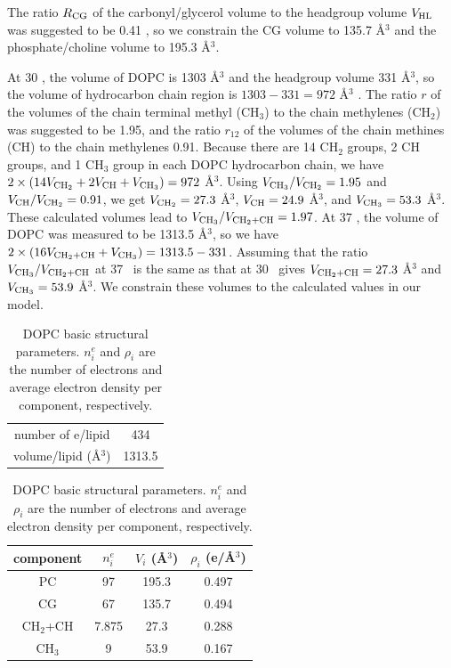 The ratio $R_\textrm{CG}$ of 
the carbonyl/glycerol volume to the headgroup volume $V_\textrm{HL}$ was
suggested to be 0.41 \cite{ref:Braun13}, so we constrain the CG
volume to 135.7 \AA$^3$ and the phosphate/choline volume to 
195.3 \AA$^3$. 

At 30 \textcelsius, the volume of DOPC is 1303 \AA$^3$ and the headgroup
volume 331 \AA$^3$, so the volume of hydrocarbon chain region is 
$1303 - 331 = 972$ \AA$^3$ \cite{ref:Braun13}. The ratio $r$ of the volumes
of the chain terminal methyl (CH$_3$) to the chain methylenes (CH$_2$) was 
suggested to be 1.95, and the ratio $r_{12}$ of the volumes of the chain
methines (CH) to the chain methylenes 0.91. Because there are 14 CH$_2$ groups,
2 CH groups, and 1 CH$_3$ group in each DOPC hydrocarbon chain, we have
$2\times(14V_{\textrm{CH}_2}+2V_\textrm{CH}+V_{\textrm{CH}_3})=972$ \AA$^3$. 
Using $V_{\textrm{CH}_3}/V_{\textrm{CH}_2}=1.95$ 
and $V_\textrm{CH}/V_{\textrm{CH}_2}=0.91$, we get $V_{\textrm{CH}_2}=27.3$ \AA$^3$, 
$V_\textrm{CH}=24.9$ \AA$^3$, and $V_{\textrm{CH}_3}=53.3$ \AA$^3$. These calculated volumes
lead to $V_{\textrm{CH}_3}/V_{\textrm{CH}_2+\textrm{CH}}=1.97$. 
At 37 \textcelsius, the volume of DOPC was measured to be 1313.5 \AA$^3$, so
we have $2\times(16V_{\textrm{CH}_2+\textrm{CH}}+V_{\textrm{CH}_3})=1313.5-331$. Assuming that the ratio 
$V_{\textrm{CH}_3}/V_{\textrm{CH}_2+\textrm{CH}}$ at 37 \textcelsius\ is the same as that at 30 \textcelsius\ 
gives $V_{\textrm{CH}_2+\textrm{CH}}=27.3$ \AA$^3$ and $V_{\textrm{CH}_3}=53.9$ \AA$^3$. We constrain
these volumes to the calculated values in our model.
\begin{table}[htbp]
  \centering
  \begin{tabular}{ cc }
  \hline
    number of e/lipid & 434 \\ 
    volume/lipid (\AA$^3$) & 1313.5 \\
  \hline
  \end{tabular}
  \quad
  \begin{tabular}{ cccc }
    \hline
    component & $n^e_i$ & $V_i$ (\AA$^3$) & $\rho_i$ (e/\AA$^3$) \\
    \hline 
    PC & 97 & 195.3 & 0.497 \\  
    CG & 67 & 135.7 & 0.494 \\  
    CH$_2$+CH & 7.875 & 27.3 & 0.288 \\
    CH$_3$ & 9 & 53.9 & 0.167 \\
    \hline
  \end{tabular}
  \caption{DOPC basic structural parameters. $n^e_i$ and $\rho_i$ are
  the number of electrons and average electron density per component, 
  respectively.}
  \label{tb:DOPC_basic_params}
\end{table}

